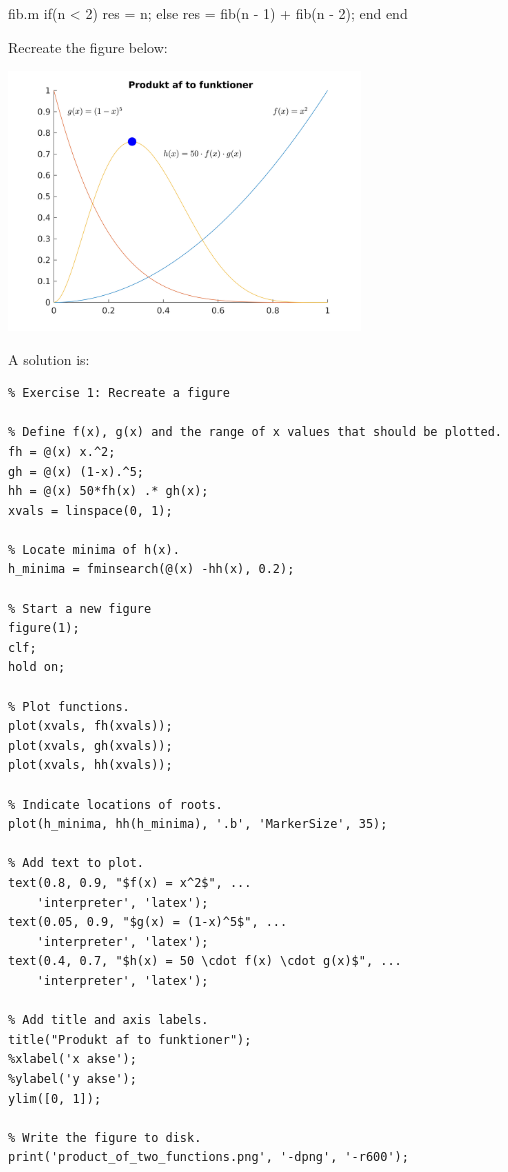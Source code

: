 \begin{ex}
\begin{solutionfile}{fib.m}
if(n < 2)
  res = n;
else
  res = fib(n - 1) + fib(n - 2);
end
end
\end{solutionfile}
\end{ex}





\begin{ex}
Recreate the figure below:
\begin{center}
\includegraphics[width=0.7\textwidth]{pic/plotting/product_of_two_functions.png}
\end{center}
\begin{hint}
\end{hint}
\begin{sol}
A solution is:
\begin{lstlisting}
% Exercise 1: Recreate a figure

% Define f(x), g(x) and the range of x values that should be plotted.
fh = @(x) x.^2;
gh = @(x) (1-x).^5;
hh = @(x) 50*fh(x) .* gh(x);
xvals = linspace(0, 1);

% Locate minima of h(x).
h_minima = fminsearch(@(x) -hh(x), 0.2);

% Start a new figure
figure(1);
clf;
hold on;

% Plot functions.
plot(xvals, fh(xvals));
plot(xvals, gh(xvals));
plot(xvals, hh(xvals));

% Indicate locations of roots.
plot(h_minima, hh(h_minima), '.b', 'MarkerSize', 35);

% Add text to plot.
text(0.8, 0.9, "$f(x) = x^2$", ...
    'interpreter', 'latex');
text(0.05, 0.9, "$g(x) = (1-x)^5$", ...
    'interpreter', 'latex');
text(0.4, 0.7, "$h(x) = 50 \cdot f(x) \cdot g(x)$", ...
    'interpreter', 'latex');

% Add title and axis labels.
title("Produkt af to funktioner");
%xlabel('x akse');
%ylabel('y akse');
ylim([0, 1]);

% Write the figure to disk.
print('product_of_two_functions.png', '-dpng', '-r600');
\end{lstlisting}
\end{sol}
\end{ex}







